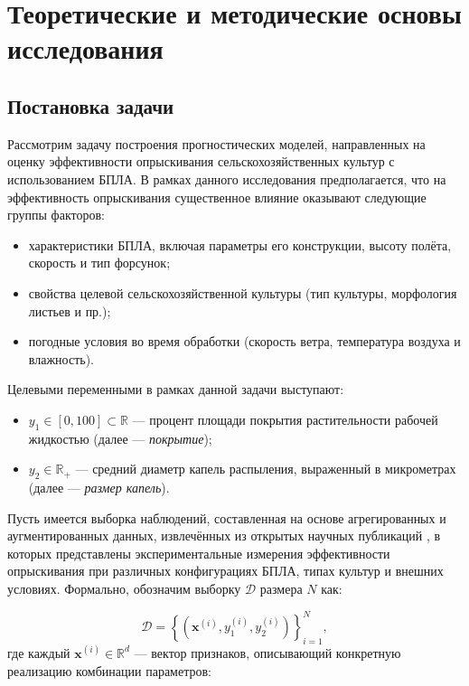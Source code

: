 \chapter{Теоретические и методические основы исследования} \label{ch1}

\section{Постановка задачи} \label{ch1:task}
Рассмотрим задачу построения прогностических моделей, направленных на оценку эффективности опрыскивания сельскохозяйственных культур с использованием БПЛА. В рамках данного исследования предполагается, что на эффективность опрыскивания существенное влияние оказывают следующие группы факторов: 
\begin{itemize}
\item характеристики БПЛА, включая параметры его конструкции, высоту полёта, скорость и тип форсунок; 
\item свойства целевой сельскохозяйственной культуры (тип культуры, морфология листьев и пр.); 
\item погодные условия во время обработки (скорость ветра, температура воздуха и влажность).
\end{itemize}

Целевыми переменными в рамках данной задачи выступают:
\begin{itemize}
\item $y_1 \in [0, 100] \subset \mathbb{R}$ --- процент площади покрытия растительности рабочей жидкостью (далее --- \textit{покрытие});
\item $y_2 \in \mathbb{R}_{+}$ --- средний диаметр капель распыления, выраженный в микрометрах (далее --- \textit{размер капель}).
\end{itemize}

Пусть имеется выборка наблюдений, составленная на основе агрегированных и аугментированных данных, извлечённых из открытых научных публикаций \cite{Liu2025, Wu2025}, в которых представлены экспериментальные измерения эффективности опрыскивания при различных конфигурациях БПЛА, типах культур и внешних условиях. Формально, обозначим выборку $\mathcal{D}$ размера $N$ как:

\begin{equation}
	\mathcal{D} = \left\{ \left(\mathbf{x}^{(i)}, y_1^{(i)}, y_2^{(i)}\right) \right\}_{i=1}^{N},
\end{equation}
где каждый $\mathbf{x}^{(i)} \in \mathbb{R}^d$ --- вектор признаков, описывающий конкретную реализацию комбинации параметров:

